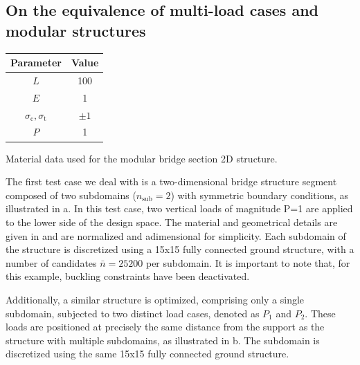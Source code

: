 \subsection{On the equivalence of multi-load cases and modular structures}
\begin{margintable}
    \small
    \centering
    \begin{tabular}{cc}
    \toprule
    \textbf{Parameter}        & \textbf{Value} \\ \midrule
    $L$              & 100     \\
    $E$              & 1     \\
    $\sigma_\text{c}, \sigma_\text{t}$ & $\pm 1$\\
    $P$              & 1   \\
    \bottomrule
    \end{tabular}
    \caption{Material data used for the modular bridge section 2D structure.}
    \label{tab:05_modular_data}
\end{margintable}
The first test case we deal with is a two-dimensional bridge structure segment composed of two subdomains ($n_{\text{sub}} = 2$) with symmetric boundary conditions, as illustrated in a. In this test case, two vertical loads of magnitude P=1 are applied to the lower side of the design space. The material and geometrical details are given in  and are normalized and adimensional for simplicity. Each subdomain of the structure is discretized using a 15x15 fully connected ground structure, with a number of candidates $\bar{n}=25200$ per subdomain. It is important to note that, for this example, buckling constraints have been deactivated.

Additionally, a similar structure is optimized, comprising only a single subdomain, subjected to two distinct load cases, denoted as $P_1$ and $P_2$. These loads are positioned at precisely the same distance from the support as the structure with multiple subdomains, as illustrated in b. The subdomain is discretized using the same 15x15 fully connected ground structure.

